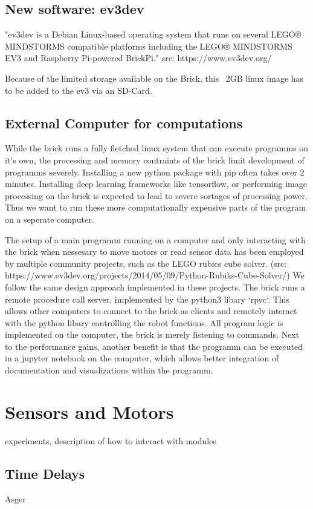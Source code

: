 \documentclass[11pt, a4paper]{article}
\begin{document}
\subsection{New software: ev3dev}
"ev3dev is a Debian Linux-based operating system that runs on several LEGO® MINDSTORMS compatible platforms including the LEGO® MINDSTORMS EV3 and Raspberry Pi-powered BrickPi." src: https://www.ev3dev.org/

Because of the limited storage available on the Brick, this ~2GB linux image has to be added to the ev3 via an SD-Card.

\subsection{External Computer for computations}
While the brick runs a fully fletched linux system that can execute programms on it's own, the processing and memory contraints of the brick limit development of programms severely. Installing a new python package with pip often takes over 2 minutes. Installing deep learning frameworks like tensorflow, or performing image processing on the brick is expected to lead to severe sortages of processing power. Thus we want to run these more computationally expensive parts of the program on a seperate computer.

The setup of a main programm running on a computer and only interacting with the brick when nessesary to move motors or read sensor data has been employed by multiple community projects, such as the LEGO rubics cube solver. (src: https://www.ev3dev.org/projects/2014/05/09/Python-Rubiks-Cube-Solver/) We follow the same design approach implemented in these projects. The brick runs a remote procedure call server, implemented by the python3 libary `rpyc`. This allows other computers to connect to the brick as clients and remotely interact with the python libary controlling the robot functions. All program logic is implemented on the computer, the brick is merely listening to commands. Next to the performance gains, another benefit is that the programm can be executed in a jupyter notebook on the computer, which allows better integration of documentation and visualizations within the programm.

\section{Sensors and Motors}
experiments, description of how to interact with modules

\subsection{Time Delays}
Asger
\end{document}
